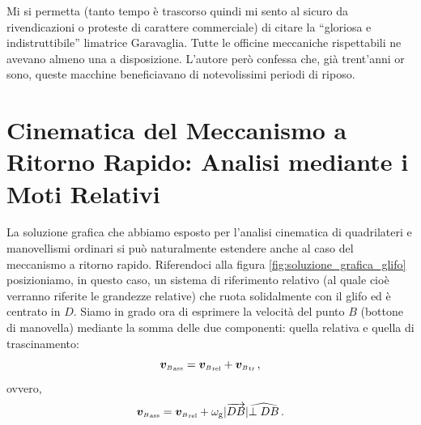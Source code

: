 \noindent Mi si permetta (tanto  tempo \`e trascorso quindi mi sento al sicuro da
rivendicazioni o proteste di carattere commerciale) di citare la ``gloriosa
e indistruttibile'' limatrice
Garavaglia.
Tutte le officine meccaniche rispettabili
ne avevano almeno una a disposizione. L'autore per\`o confessa che, gi\`a
trent'anni or sono, queste macchine beneficiavano di
notevolissimi periodi di riposo.

\section{Cinematica del Meccanismo a Ritorno Rapido: Analisi 
mediante i Moti Relativi}

\noindent La soluzione grafica che abbiamo esposto per l'analisi cinematica
di quadrilateri e manovellismi ordinari si pu\`o naturalmente estendere
anche al caso del meccanismo a ritorno rapido.
\noindent Riferendoci alla figura \ref{fig:soluzione_grafica_glifo}
posizioniamo, in questo caso, un sistema di riferimento relativo (al quale cio\`e
verranno riferite le grandezze relative) che ruota solidalmente con il
glifo ed \`e centrato in $D$.
Siamo in grado ora di esprimere la velocit\`a del punto $B$ (bottone di
manovella) mediante la somma delle due componenti: quella relativa
e quella di trascinamento:
\begin{equation}
{{\bm v}_{\scriptscriptstyle{B}}}_{\scriptscriptstyle{{\rm ass}}}= 
{{\bm v}_{\scriptscriptstyle{B}}}_{\scriptscriptstyle{{\rm rel}}}+
{{\bm v}_{\scriptscriptstyle{B}}}_{\scriptscriptstyle{{\rm tr}}}\,,
\label{eq:glifo_vel_graf0}
\end{equation}
\noindent ovvero, 
\begin{equation}
{{\bm v}_{\scriptscriptstyle{B}}}_{\scriptscriptstyle{{\rm ass}}}= 
{{\bm v}_{\scriptscriptstyle{B}}}_{\scriptscriptstyle{{\rm rel}}}+
{\omega_{\rm g}}|\overrightarrow{DB}|\widehat{{\perp{DB}}}\,.
\label{eq:glifo_vel_graf1}
\end{equation}

